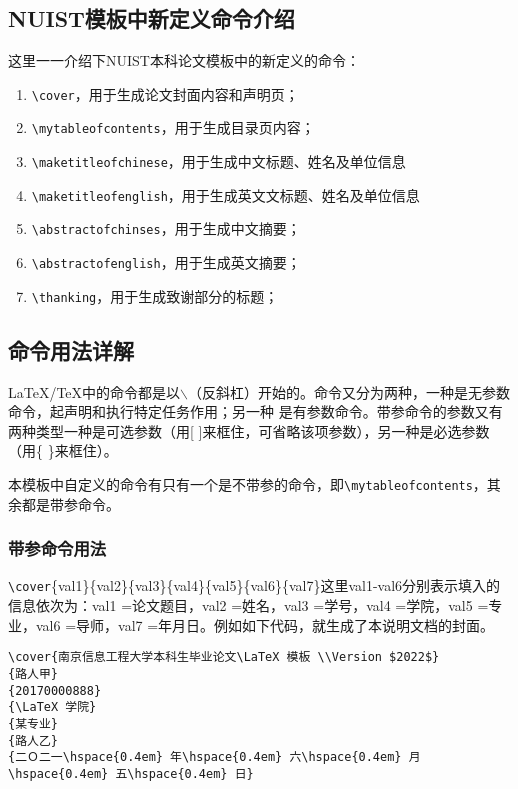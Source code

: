 \subsection{NUIST模板中新定义命令介绍}

这里一一介绍下NUIST本科论文模板中的新定义的命令：

{
\color{blue}
\begin{enumerate}
    \item \verb|\cover|，用于生成论文封面内容和声明页；
    \item \verb|\mytableofcontents|，用于生成目录页内容；
    \item \verb|\maketitleofchinese|，用于生成中文标题、姓名及单位信息
    \item \verb|\maketitleofenglish|，用于生成英文文标题、姓名及单位信息
    \item \verb|\abstractofchinses|，用于生成中文摘要；
    \item \verb|\abstractofenglish|，用于生成英文摘要；
    \item \verb|\thanking|，用于生成致谢部分的标题；
\end{enumerate}
}

\subsection{命令用法详解}

\LaTeX/\TeX 中的命令都是以$\backslash$（反斜杠）开始的。命令又分为两种，一种是无参数命令，起声明和执行特定任务作用；另一种 是有参数命令。带参命令的参数又有两种类型一种是可选参数（用[ ]来框住，可省略该项参数），另一种是必选参数（用\{ \}来框住）。

本模板中自定义的命令有只有一个是不带参的命令，即\verb|\mytableofcontents|，其余都是带参命令。

\subsubsection{带参命令用法}

\verb|\cover|\{val1\}\{val2\}\{val3\}\{val4\}\{val5\}\{val6\}\{val7\}这里val1-val6分别表示填入的信息依次为：val1 =论文题目，val2 =姓名，val3 =学号，val4 =学院，val5 =专业，val6 =导师，val7 =年月日。例如如下代码，就生成了本说明文档的封面。

{
\color{green!50!black}
\begin{lstlisting}[breaklines=true,]
\cover{南京信息工程大学本科生毕业论文\LaTeX 模板 \\Version $2022$}
{路人甲}
{20170000888}
{\LaTeX 学院}
{某专业}
{路人乙}
{二Ｏ二一\hspace{0.4em} 年\hspace{0.4em} 六\hspace{0.4em} 月\hspace{0.4em} 五\hspace{0.4em} 日}
\end{lstlisting}
}

